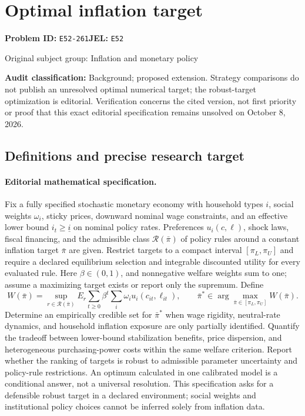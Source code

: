 \documentclass[11pt,a4paper]{article}
\begin{document}
\section*{Optimal inflation target}
\textbf{Problem ID:} \texttt{E52-261}\quad \textbf{JEL:} \texttt{E52}\par
\label{problem:OP-0247}
{\sffamily\small\color{muted}Original subject group: Inflation and monetary policy\par}
\label{definitions:problem:30007528}
\textbf{Audit classification:} Background; proposed extension. Strategy comparisons do not publish an unresolved optimal numerical target; the robust-target optimization is editorial. Verification concerns the cited version, not first priority or proof that this exact editorial specification remains unsolved on October 8, 2026.
\subsection*{Definitions and precise research target}
\paragraph{Editorial mathematical specification.} Fix a fully specified stochastic monetary economy with household types \(i\), social weights \(\omega_i\), sticky prices, downward nominal wage constraints, and an effective lower bound \(i_t\ge\underline i\) on nominal policy rates. Preferences \(u_i(c,\ell)\), shock laws, fiscal financing, and the admissible class \(\mathcal R(\bar\pi)\) of policy rules around a constant inflation target \(\bar\pi\) are given. Restrict targets to a compact interval \([\pi_L,\pi_U]\) and require a declared equilibrium selection and integrable discounted utility for every evaluated rule. Here \(\beta\in(0,1)\), and nonnegative welfare weights sum to one; assume a maximizing target exists or report only the supremum.
Define
\[
W(\bar\pi)=\sup_{r\in\mathcal R(\bar\pi)}
E_r\sum_{t\ge0}\beta^t\sum_i\omega_i u_i(c_{it},\ell_{it}),\qquad
\bar\pi^*\in\arg\max_{\bar\pi\in[\pi_L,\pi_U]}W(\bar\pi).
\]
Determine an empirically credible set for \(\bar\pi^*\) when wage rigidity, neutral-rate dynamics, and household inflation exposure are only partially identified. Quantify the tradeoff between lower-bound stabilization benefits, price dispersion, and heterogeneous purchasing-power costs within the same welfare criterion. Report whether the ranking of targets is robust to admissible parameter uncertainty and policy-rule restrictions. An optimum calculated in one calibrated model is a conditional answer, not a universal resolution. This specification asks for a defensible robust target in a declared environment; social weights and institutional policy choices cannot be inferred solely from inflation data.
\end{document}
